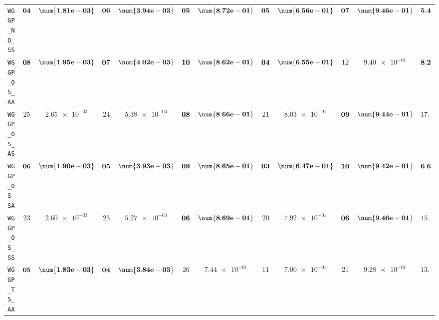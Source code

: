 \begin{xltabular}{\textwidth}{l||cC|cC|cC|cC|cC||c}
	\texttt{WGGP\_NO\_SS} & $\bf 04$ & $\bf \num{1.81e-03}$ & $\bf 06$ & $\bf \num{3.94e-03}$ & $\bf 05$ & $\bf \num{8.72e-01}$ & $\bf 05$ & $\bf \num{6.56e-01}$ & $\bf 07$ & $\bf \num{9.46e-01}$ & $\bf 5.4$  \\
	\texttt{WGGP\_OS\_AA} & $\bf 08$ & $\bf \num{1.95e-03}$ & $\bf 07$ & $\bf \num{4.02e-03}$ & $\bf 10$ & $\bf \num{8.62e-01}$ & $\bf 04$ & $\bf \num{6.55e-01}$ & $ 12$ & $ \num{9.40e-01}$ & $\bf 8.2$  \\
	\texttt{WGGP\_OS\_AS} & $ 25$ & $ \num{2.65e-03}$ & $ 24$ & $ \num{5.38e-03}$ & $\bf 08$ & $\bf \num{8.66e-01}$ & $ 21$ & $ \num{8.03e-01}$ & $\bf 09$ & $\bf \num{9.44e-01}$ & $ 17.4$  \\
	\texttt{WGGP\_OS\_SA} & $\bf 06$ & $\bf \num{1.90e-03}$ & $\bf 05$ & $\bf \num{3.93e-03}$ & $\bf 09$ & $\bf \num{8.65e-01}$ & $\bf 03$ & $\bf \num{6.47e-01}$ & $\bf 10$ & $\bf \num{9.42e-01}$ & $\bf 6.6$  \\
	\texttt{WGGP\_OS\_SS} & $ 23$ & $ \num{2.60e-03}$ & $ 23$ & $ \num{5.27e-03}$ & $\bf 06$ & $\bf \num{8.69e-01}$ & $ 20$ & $ \num{7.92e-01}$ & $\bf 06$ & $\bf \num{9.46e-01}$ & $ 15.6$  \\
	\texttt{WGGP\_TS\_AA} & $\bf 05$ & $\bf \num{1.83e-03}$ & $\bf 04$ & $\bf \num{3.84e-03}$ & $ 26$ & $ \num{7.44e-01}$ & $ 11$ & $ \num{7.00e-01}$ & $ 21$ & $ \num{9.28e-01}$ & $ 13.4$  \\

\end{xltabular}
